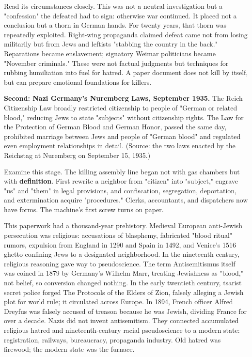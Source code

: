 Read its circumstances closely. This was not a neutral investigation but a "confession" the defeated had to sign: otherwise war continued. It placed not a conclusion but a thorn in German hands. For twenty years, that thorn was repeatedly exploited. Right-wing propaganda claimed defeat came not from losing militarily but from Jews and leftists "stabbing the country in the back." Reparations became enslavement; signatory Weimar politicians became "November criminals." These were not factual judgments but techniques for rubbing humiliation into fuel for hatred. A paper document does not kill by itself, but can prepare emotional foundations for killers.

\textbf{Second: Nazi Germany's Nuremberg Laws, September 1935.} The Reich Citizenship Law broadly restricted citizenship to people of "German or related blood," reducing Jews to state "subjects" without citizenship rights. The Law for the Protection of German Blood and German Honor, passed the same day, prohibited marriage between Jews and people of "German blood" and regulated even employment relationships in detail. (Source: the two laws enacted by the Reichstag at Nuremberg on September 15, 1935.)

Examine this stage. The killing assembly line began not with gas chambers but with \textbf{definition}. First rewrite a neighbor from "citizen" into "subject," engrave "us" and "them" in legal provisions, and confiscation, segregation, deportation, and extermination acquire "procedures." Clerks, accountants, and dispatchers now have forms. The machine's first screw turns on paper.

This paperwork had a thousand-year prehistory. Medieval European anti-Jewish persecution was religious: accusations of blasphemy, fabricated "blood ritual" rumors, expulsion from England in 1290 and Spain in 1492, and Venice's 1516 ghetto confining Jews to a designated neighborhood. In the nineteenth century, religious reasoning gave way to pseudoscience. The term Antisemitismus itself was coined in 1879 by Germany's Wilhelm Marr, treating Jewishness as "blood," not belief, so conversion changed nothing. In the early twentieth century, tsarist secret police forged The Protocols of the Elders of Zion, falsely alleging a Jewish plot for world rule; it circulated across Europe. In 1894, French officer Alfred Dreyfus was falsely accused of treason because he was Jewish, dividing France for over a decade. Nazis did not invent antisemitism. They connected accumulated religious hatred and nineteenth-century racial pseudoscience to a modern state: registration, railways, bureaucracy, propaganda industry. Old hatred was firewood; the modern state was the furnace.

